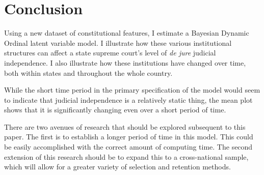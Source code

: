 \documentclass[12pt]{article}
\begin{document}
\section{Conclusion}
Using a new dataset of constitutional features, I estimate a Bayesian Dynamic Ordinal latent variable model.  I illustrate how these various institutional structures can affect a state supreme court's level of \textit{de jure} judicial independence.  I also illustrate how these institutions have changed over time, both within states and throughout the whole country.  

While the short time period in the primary specification of the model would seem to indicate that judicial independence is a relatively static thing, the mean plot shows that it is significantly changing even over a short period of time. 

There are two avenues of research that should be explored subsequent to this paper.  The first is to establish a longer period of time in this model.  This could be easily accomplished with the correct amount of computing time.  The second extension of this research should be to expand this to a cross-national sample, which will allow for a greater variety of selection and retention methods.

\singlespacing



\appendix
\end{document}
